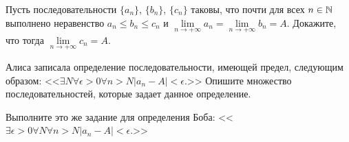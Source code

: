 \documentclass[a4paper, 12pt, num=30]{listok}
\begin{document}
\begin{problem}
    Пусть последовательности $\{a_n\}$, $\{b_n\}$, $\{c_n\}$ таковы, что почти для всех $n \in \mathbb{N}$ выполнено неравенство
    $a_n \le b_n \le c_n$ и $\lim\limits_{n\to+\infty} a_n = \lim\limits_{n\to+\infty} b_n = A$.
    Докажите, что тогда $\lim\limits_{n\to+\infty} c_n = A$.
\end{problem}
\begin{problem}
\begin{probparts}
    \item Алиса записала определение последовательности, имеющей предел, следующим образом:
        <<$
            \exists{N}\forall{\epsilon > 0}\forall{n > N} |a_n - A| < \epsilon.
        $>>
        Опишите множество последовательностей, которые задает данное определение.
    \item Выполните это же задание для определения Боба:
        <<$
            \exists{\epsilon > 0} \forall N \forall{n > N} |a_n - A| < \epsilon.
        $>>
\end{probparts}
\end{problem}
\end{document}
